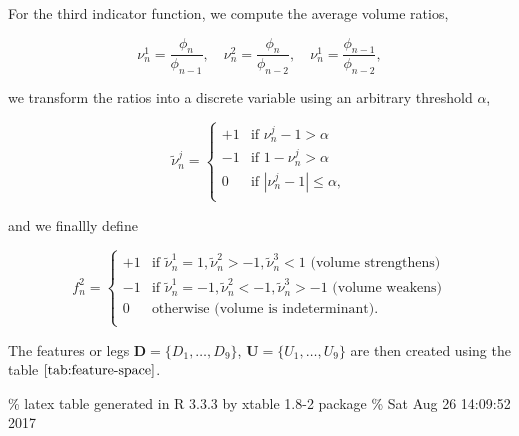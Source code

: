 \documentclass[]{article}
\newcommand{\mat}[1]{\bm{#1}}
\begin{document}
For the third indicator function, we compute the average volume ratios,

\[
\nu_n^1 = \frac{\phi_n}{\phi_{n-1}}, \quad \nu_n^2 = \frac{\phi_n}{\phi_{n-2}}, \quad \nu_n^1 = \frac{\phi_{n-1}}{\phi_{n-2}},
\]

we transform the ratios into a discrete variable using an arbitrary
threshold \(\alpha\),

\[
\tilde{\nu}_n^j =
\begin{cases}
+1 & \text{if $\nu_n^j - 1 > \alpha$} \\
-1 & \text{if $1 - \nu_n^j > \alpha$} \\
 0 & \text{if $|\nu_n^j - 1| \le \alpha$}, \\
\end{cases}
\]

and we finallly define

\[
f_n^2 =
\begin{cases}
+1 & \text{if $\tilde{\nu}_n^1 = 1, \tilde{\nu}_n^2 > -1, \tilde{\nu}_n^3 < 1$ (volume strengthens)} \\
-1 & \text{if $\tilde{\nu}_n^1 = -1, \tilde{\nu}_n^2 < -1, \tilde{\nu}_n^3 > -1$ (volume weakens)} \\
 0 & \text{otherwise (volume is indeterminant)}. \\
\end{cases}
\]

The features or legs \(\mat{D} = \{D_1, \dots, D_9 \}\),
\(\mat{U} = \{U_1, \dots, U_9 \}\) are then created using the table
\(\ref{tab:feature-space}\).

\% latex table generated in R 3.3.3 by xtable 1.8-2 package \% Sat Aug
26 14:09:52 2017
\end{document}
